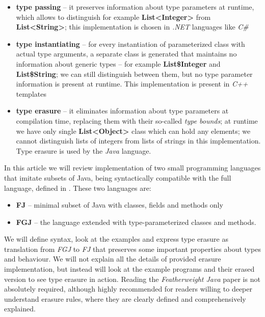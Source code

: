 \documentclass{article}[12pt]
\begin{document}
\begin{itemize}

\item{\textbf{type passing}} -- it preserves information about
  type parameters at runtime, which allows to distinguish
  for example \textbf{List<Integer>} from \textbf{List<String>}; 
  this implementation is chosen in \emph{.NET} languages like
  \emph{C\#}

\item{\textbf{type instantiating}} -- for every instantiation of
  parameterized class with actual type arguments, a separate
  class is generated that maintains no information about generic
  types -- for example \textbf{List\$Integer} and \textbf{List\$String};
  we can still distinguish between them, but no type parameter
  information is present at runtime. This implementation is present
  in \emph{C++} templates

\item{\textbf{type erasure}} -- it eliminates information about
  type parameters at compilation time, replacing them with their
  so-called \emph{type bounds}; at runtime we have only single
  \textbf{List<Object>} class which can hold any elements; we cannot
  distinguish lists of integers from lists of strings in this
  implementation. Type erasure is used by the \emph{Java} language.

\end{itemize}


In this article we will review implementation of two small
programming languages that imitate subsets of Java, being
syntactically compatible with the full language, defined in
\cite{fj}. These two languages are:

\begin{itemize}
\item{\textbf{FJ}} -- minimal subset of Java with classes,
fields and methods only
\item{\textbf{FGJ}} -- the language extended with
type-parameterized classes and methods.
\end{itemize}
We will define syntax, look at the examples and express type
erasure as translation from \emph{FGJ} to \emph{FJ} that
preserves some important properties about types and behaviour.
We will not explain all the details of provided erasure
implementation, but instead will look at the example programs
and their erased version to see type erasure in action. Reading
the \emph{Featherweight Java} paper is not absolutely required,
although highly recommended for readers willing to deeper
understand erasure rules, where they are clearly defined and
comprehensively explained.
\end{document}
